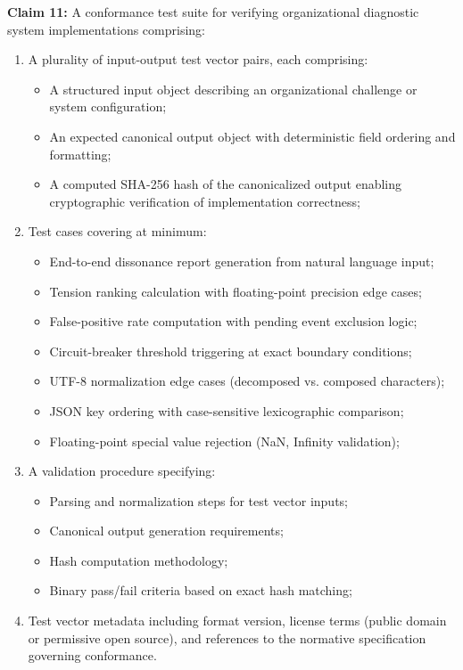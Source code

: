 \documentclass[11pt,a4paper]{article}
\begin{document}
\textbf{Claim 11:} A conformance test suite for verifying organizational 
diagnostic system implementations comprising:
\begin{enumerate}
\item A plurality of input-output test vector pairs, each comprising:
\begin{itemize}
\item A structured input object describing an organizational challenge 
or system configuration;
\item An expected canonical output object with deterministic field 
ordering and formatting;
\item A computed SHA-256 hash of the canonicalized output enabling 
cryptographic verification of implementation correctness;
\end{itemize}

\item Test cases covering at minimum:
\begin{itemize}
\item End-to-end dissonance report generation from natural language input;
\item Tension ranking calculation with floating-point precision edge cases;
\item False-positive rate computation with pending event exclusion logic;
\item Circuit-breaker threshold triggering at exact boundary conditions;
\item UTF-8 normalization edge cases (decomposed vs. composed characters);
\item JSON key ordering with case-sensitive lexicographic comparison;
\item Floating-point special value rejection (NaN, Infinity validation);
\end{itemize}

\item A validation procedure specifying:
\begin{itemize}
\item Parsing and normalization steps for test vector inputs;
\item Canonical output generation requirements;
\item Hash computation methodology;
\item Binary pass/fail criteria based on exact hash matching;
\end{itemize}

\item Test vector metadata including format version, license terms 
(public domain or permissive open source), and references to the 
normative specification governing conformance.
\end{enumerate}
\end{document}
